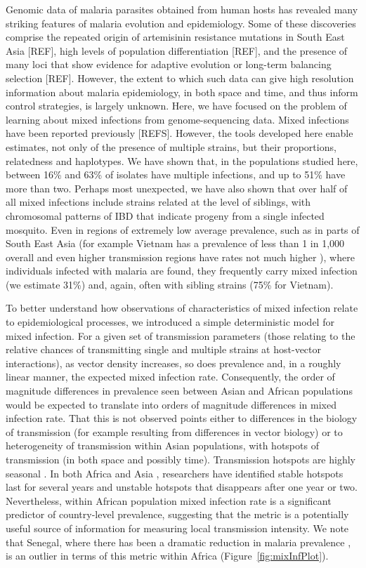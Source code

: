 \documentclass[9pt,lineno]{elife}
\begin{document}
Genomic data of malaria parasites obtained from human hosts has revealed many striking features of malaria evolution and epidemiology. Some of these discoveries comprise the repeated origin of artemisinin resistance mutations in South East Asia [REF], high levels of population differentiation [REF], and the presence of many loci that show evidence for adaptive evolution or long-term balancing selection [REF].  However, the extent to which such data can give high resolution information about malaria epidemiology, in both space and time, and thus inform control strategies, is largely unknown.  Here, we have focused on the problem of learning about mixed infections from genome-sequencing data.  Mixed infections have been reported previously [REFS].  However, the tools developed here enable estimates, not only of the presence of multiple strains, but their proportions, relatedness and haplotypes.  We have shown that, in the populations studied here, between 16\% and 63\% of isolates have multiple infections, and up to 51\% have more than two.  Perhaps most unexpected, we have also shown that over half of all mixed infections include strains related at the level of siblings, with chromosomal patterns of IBD that indicate progeny from a single infected mosquito.  Even in regions of extremely low average prevalence, such as in parts of South East Asia (for example Vietnam has a prevalence of less than 1 in 1,000 overall and even higher transmission regions have rates not much higher \citep{who2017, who2017profile}), where individuals infected with malaria are found, they frequently carry mixed infection (we estimate 31\%) and, again, often with sibling strains (75\% for Vietnam).

To better understand how observations of characteristics of mixed infection relate to epidemiological processes, we introduced a simple deterministic model for mixed infection.  For a given set of transmission parameters (those relating to the relative chances of transmitting single and multiple strains at host-vector interactions), as vector density increases, so does prevalence and, in a roughly linear manner, the expected mixed infection rate.  Consequently, the order of magnitude differences in prevalence seen between Asian and African populations would be expected to translate into orders of magnitude differences in mixed infection rate. That this is not observed points either to differences in the biology of transmission (for example resulting from differences in vector biology) or to heterogeneity of transmission within Asian populations, with hotspots of transmission (in both space and possibly time). Transmission hotspots are highly seasonal \citep{Ahmed2013}. In both Africa \citep{Bejon2010} and Asia \citep{Heng2017}, researchers have identified stable hotspots last for several years and unstable hotspots that disappears after one year or two. Nevertheless, within African population mixed infection rate is a significant predictor of country-level prevalence, suggesting that the metric is a potentially useful source of information for measuring local transmission intensity.  We note that Senegal, where there has been a dramatic reduction in malaria prevalence \citep{Daniels2015}, is an outlier in terms of this metric within Africa (Figure~\ref{fig:mixInfPlot}).
\end{document}

